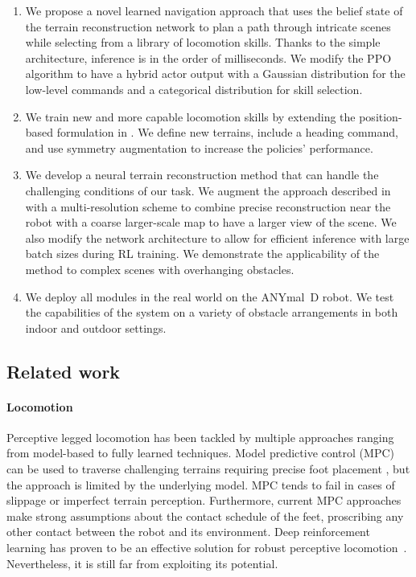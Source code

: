 \documentclass[conference]{IEEEtran}
\begin{document}
\begin{enumerate}
    \item We propose a novel learned navigation approach that uses the belief state of the terrain reconstruction network to plan a path through intricate scenes while selecting from a library of locomotion skills. 
    Thanks to the simple architecture, inference is in the order of milliseconds.
    We modify the PPO~\cite{schulman2017ppo} algorithm to have a hybrid actor output with a Gaussian distribution for the low-level commands and a categorical distribution for skill selection.
    \item We train new and more capable locomotion skills by extending the position-based formulation in \cite{rudinAdvancedSkills}. We define new terrains, include a heading command, and use symmetry augmentation to increase the policies' performance.
    \item We develop a neural terrain reconstruction method that can handle the challenging conditions of our task. We augment the approach described in \cite{hoeller2022TREP} with a multi-resolution scheme to combine precise reconstruction near the robot with a coarse larger-scale map to have a larger view of the scene. We also modify the network architecture to allow for efficient inference with large batch sizes during RL training.
    We demonstrate the applicability of the method to complex scenes with overhanging obstacles.
    \item We deploy all modules in the real world on the ANYmal~D robot. We test the capabilities of the system on a variety of obstacle arrangements in both indoor and outdoor settings.
\end{enumerate}


\subsection{Related work}

\paragraph{Locomotion}
Perceptive legged locomotion has been tackled by multiple approaches ranging from model-based to fully learned techniques. Model predictive control (MPC) can be used to traverse challenging terrains requiring precise foot placement \cite{grandia2022perceptive, jenelten2022Tamols, kim2020loco}, but the approach is limited by the underlying model. MPC tends to fail in cases of slippage or imperfect terrain perception. Furthermore, current MPC approaches make strong assumptions about the contact schedule of the feet, proscribing any other contact between the robot and its environment.
Deep reinforcement learning has proven to be an effective solution for robust perceptive locomotion~\cite{miki2021locomotion, loquercio2022learn, gangapurwala2020RLOCTL}. Nevertheless, it is still far from exploiting its potential.
\end{document}
